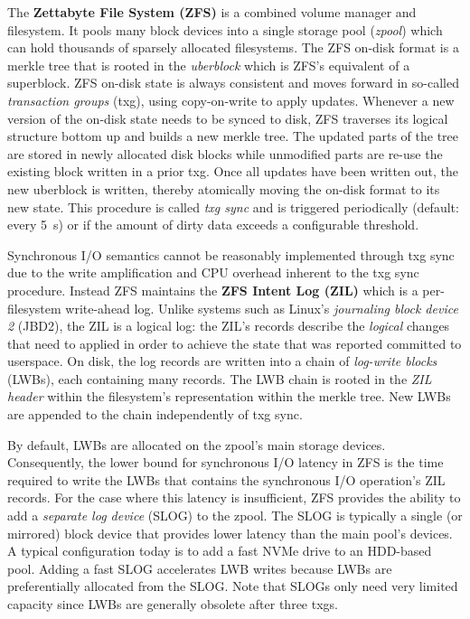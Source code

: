\documentclass[12pt,a4paper,twoside,draft]{book}
\begin{document}
The \textbf{Zettabyte File System (ZFS)} is a combined volume manager and filesystem.
It pools many block devices into a single storage pool (\textit{zpool}) which can hold thousands of sparsely allocated filesystems.
The ZFS on-disk format is a merkle tree that is rooted in the \textit{uberblock} which is ZFS's equivalent of a superblock.
ZFS on-disk state is always consistent and moves forward in so-called \textit{transaction groups} (txg), using copy-on-write to apply updates.
Whenever a new version of the on-disk state needs to be synced to disk, ZFS traverses its logical structure bottom up and builds a new merkle tree.
The updated parts of the tree are stored in newly allocated disk blocks while unmodified parts are re-use the existing block written in a prior txg.
Once all updates have been written out, the new uberblock is written, thereby atomically moving the on-disk format to its new state.
This procedure is called \textit{txg sync} and is triggered periodically (default: every \SI{5}{s}) or if the amount of dirty data exceeds a configurable threshold.

Synchronous I/O semantics cannot be reasonably implemented through txg sync due to the write amplification and CPU overhead inherent to the txg sync procedure.
Instead ZFS maintains the \textbf{ZFS Intent Log (ZIL)} which is a per-filesystem write-ahead log.
Unlike systems such as Linux's \textit{journaling block device 2} (JBD2), the ZIL is a logical log:
the ZIL's records describe the \textit{logical} changes that need to applied in order to achieve the state that was reported committed to userspace.
On disk, the log records are written into a chain of \textit{log-write blocks} (LWBs), each containing many records.
The LWB chain is rooted in the \textit{ZIL header} within the filesystem's representation within the merkle tree.
New LWBs are appended to the chain independently of txg sync.

By default, LWBs are allocated on the zpool's main storage devices.
Consequently, the lower bound for synchronous I/O latency in ZFS is the time required to write the LWBs that contains the synchronous I/O operation's ZIL records.
For the case where this latency is insufficient, ZFS provides the ability to add a \textit{separate log device} (SLOG) to the zpool.
The SLOG is typically a single (or mirrored) block device that provides lower latency than the main pool's devices.
A typical configuration today is to add a fast NVMe drive to an HDD-based pool.
Adding a fast SLOG accelerates LWB writes because LWBs are preferentially allocated from the SLOG.
Note that SLOGs only need very limited capacity since LWBs are generally obsolete after three txgs.
\end{document}
